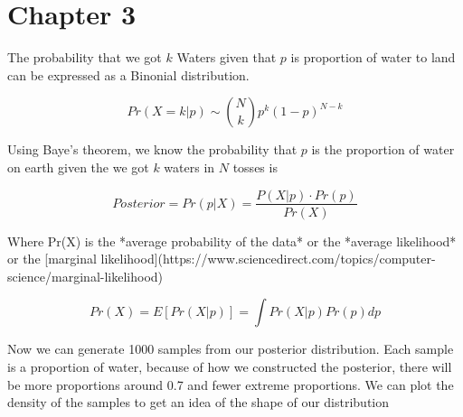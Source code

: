 \section*{Chapter 3}
The probability that we got $k$ Waters given that $p$ is proportion of water to land can be expressed as a Binonial distribution.

\begin{equation}
Pr(X=k|p) \sim \binom{N}{k}p^k(1-p)^{N-k}
\end{equation}

Using Baye's theorem, we know the probability that $p$ is the proportion of water on earth given the we got $k$ waters in $N$ tosses is 

\begin{equation}
Posterior = Pr(p|X) = \frac{P(X|p) \cdot Pr(p)}{Pr(X)}
\end{equation}

Where Pr(X) is the *average probability of the data* or the *average likelihood* or the [marginal likelihood](https://www.sciencedirect.com/topics/computer-science/marginal-likelihood)

\begin{equation}
Pr(X) = E[Pr(X|p)] = \int Pr(X|p) Pr(p)dp
\end{equation}


Now we can generate 1000 samples from our posterior distribution. Each
sample is a proportion of water, because of how we constructed the
posterior, there will be more proportions around 0.7 and fewer extreme
proportions. We can plot the density of the samples to get an idea of the shape of 
our distribution